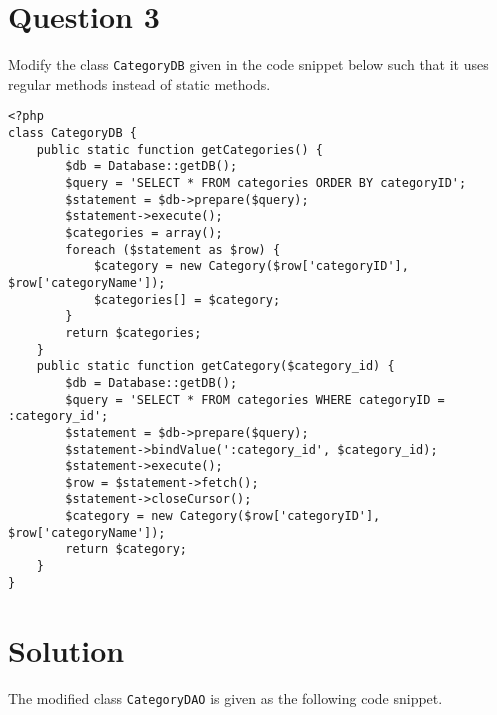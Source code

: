
\section*{Question 3}

Modify the class \texttt{CategoryDB} given in the code snippet below such that it uses regular methods instead of static methods.

\lstset{language=php, tabsize=2}
\begin{lstlisting}
<?php
class CategoryDB {
    public static function getCategories() {
        $db = Database::getDB();
        $query = 'SELECT * FROM categories ORDER BY categoryID';
        $statement = $db->prepare($query);
        $statement->execute();
        $categories = array();
        foreach ($statement as $row) {
            $category = new Category($row['categoryID'], $row['categoryName']);
            $categories[] = $category;
        }
        return $categories;
    }
    public static function getCategory($category_id) {
        $db = Database::getDB();
        $query = 'SELECT * FROM categories WHERE categoryID = :category_id';
        $statement = $db->prepare($query);
        $statement->bindValue(':category_id', $category_id);
        $statement->execute();
        $row = $statement->fetch();
        $statement->closeCursor();
        $category = new Category($row['categoryID'], $row['categoryName']);
        return $category;
    }
}
\end{lstlisting}

\section*{Solution}

The modified class \texttt{CategoryDAO} is given as the following code snippet.

